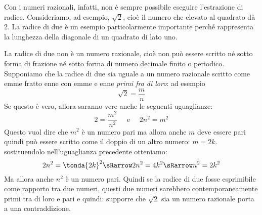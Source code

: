 Con i numeri razionali, infatti, non è sempre possibile eseguire 
l'estrazione di radice. Consideriamo, ad esempio, \(\sqrt{2}\), cioè il 
numero che elevato al quadrato dà 2. La radice di due è un esempio 
particolarmente importante perché rappresenta la lunghezza della 
diagonale di un quadrato di lato uno.


La radice di due non è un numero razionale, cioè non può essere scritto 
né sotto forma di frazione né sotto forma di numero decimale finito o 
periodico. 
Supponiamo che la radice di due sia uguale a un numero razionale 
scritto come emme fratto enne con emme e enne \emph{primi fra di loro}: 
ad esempio 
\[\sqrt{2}=\dfrac{m}{n}\]
Se questo è vero, allora saranno vere anche le seguenti uguaglianze:
\[2= \dfrac{m^2}{n^2} \quad \text{ e } \quad 2n^2 = m^2\]
Questo vuol dire che \(m^2\) è un numero pari ma allora anche \(m\) deve 
essere pari quindi può essere scritto come il doppio di un altro numero:
\(m=2k\). sostituendolo nell'uguaglianza precedente otteniamo:
\[2n^2 = \tonda{2k}^2 \sRarrow 2n^2 = 4k^2 \sRarrow n^2 = 2k^2\]
Ma allora anche \(n^2\) è un numero pari. Quindi se la radice di due 
fosse esprimibile come rapporto tra due numeri, questi due numeri 
sarebbero contemporaneamente primi tra di loro e pari e quindi: supporre 
che \(\sqrt{2}\) sia un numero razionale porta a una contraddizione.




